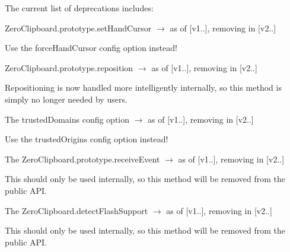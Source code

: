 The current list of deprecations includes\-:
\begin{DoxyItemize}
\item {\ttfamily Zero\-Clipboard.\-prototype.\-set\-Hand\-Cursor} {$\rightarrow$} as of \mbox{[}v1..\mbox{]}, removing in \mbox{[}v2..\mbox{]}
\begin{DoxyItemize}
\item Use the {\ttfamily force\-Hand\-Cursor} config option instead!
\end{DoxyItemize}
\item {\ttfamily Zero\-Clipboard.\-prototype.\-reposition} {$\rightarrow$} as of \mbox{[}v1..\mbox{]}, removing in \mbox{[}v2..\mbox{]}
\begin{DoxyItemize}
\item Repositioning is now handled more intelligently internally, so this method is simply no longer needed by users.
\end{DoxyItemize}
\item The {\ttfamily trusted\-Domains} config option {$\rightarrow$} as of \mbox{[}v1..\mbox{]}, removing in \mbox{[}v2..\mbox{]}
\begin{DoxyItemize}
\item Use the {\ttfamily trusted\-Origins} config option instead!
\end{DoxyItemize}
\item The {\ttfamily Zero\-Clipboard.\-prototype.\-receive\-Event} {$\rightarrow$} as of \mbox{[}v1..\mbox{]}, removing in \mbox{[}v2..\mbox{]}
\begin{DoxyItemize}
\item This should only be used internally, so this method will be removed from the public A\-P\-I.
\end{DoxyItemize}
\item The {\ttfamily Zero\-Clipboard.\-detect\-Flash\-Support} {$\rightarrow$} as of \mbox{[}v1..\mbox{]}, removing in \mbox{[}v2..\mbox{]}
\begin{DoxyItemize}
\item This should only be used internally, so this method will be removed from the public A\-P\-I. 
\end{DoxyItemize}
\end{DoxyItemize}